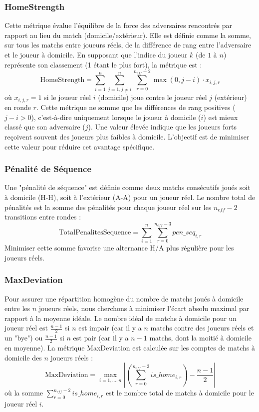 \documentclass[11pt, a4paper]{article}
\begin{document}
\subsubsection{HomeStrength}
Cette métrique évalue l'équilibre de la force des adversaires rencontrés par rapport au lieu du match (domicile/extérieur). Elle est définie comme la somme, sur tous les matchs entre joueurs réels, de la différence de rang entre l'adversaire et le joueur à domicile. En supposant que l'indice du joueur $k$ (de $1$ à $n$) représente son classement (1 étant le plus fort), la métrique est :
\begin{equation}
    \text{HomeStrength} = \sum_{i=1}^{n} \sum_{j=1, j \neq i}^{n} \sum_{r=0}^{n_{eff}-2} \max(0, j - i) \cdot x_{i,j,r}
    \label{eq:homestrength}
\end{equation}
où $x_{i,j,r}=1$ si le joueur réel $i$ (domicile) joue contre le joueur réel $j$ (extérieur) en ronde $r$.
Cette métrique ne somme que les différences de rang positives ($j-i > 0$), c'est-à-dire uniquement lorsque le joueur à domicile ($i$) est mieux classé que son adversaire ($j$). Une valeur élevée indique que les joueurs forts reçoivent souvent des joueurs plus faibles à domicile. L'objectif est de minimiser cette valeur pour réduire cet avantage spécifique.

\subsubsection{Pénalité de Séquence}
Une "pénalité de séquence" est définie comme deux matchs consécutifs joués soit à domicile (H-H), soit à l'extérieur (A-A) pour un joueur réel. Le nombre total de pénalités est la somme des pénalités pour chaque joueur réel sur les $n_{eff}-2$ transitions entre rondes :
\begin{equation}
    \text{TotalPenalitesSequence} = \sum_{i=1}^{n} \sum_{r=0}^{n_{eff}-3} pen\_seq_{i,r}
\end{equation}
Minimiser cette somme favorise une alternance H/A plus régulière pour les joueurs réels.

\subsubsection{MaxDeviation}
Pour assurer une répartition homogène du nombre de matchs joués à domicile entre les $n$ joueurs réels, nous cherchons à minimiser l'écart absolu maximal par rapport à la moyenne idéale. Le nombre idéal de matchs à domicile pour un joueur réel est $\frac{n-1}{2}$ si $n$ est impair (car il y a $n$ matchs contre des joueurs réels et un "bye") ou $\frac{n-1}{2}$ si $n$ est pair (car il y a $n-1$ matchs, dont la moitié à domicile en moyenne). La métrique MaxDeviation est calculée sur les comptes de matchs à domicile des $n$ joueurs réels :
\begin{equation}
    \text{MaxDeviation} = \max_{i=1,\dots,n} \left| \left( \sum_{r=0}^{n_{eff}-2} is\_home_{i,r} \right) - \frac{n-1}{2} \right|
\end{equation}
où la somme $\sum_{r=0}^{n_{eff}-2} is\_home_{i,r}$ est le nombre total de matchs à domicile pour le joueur réel $i$.
\end{document}
